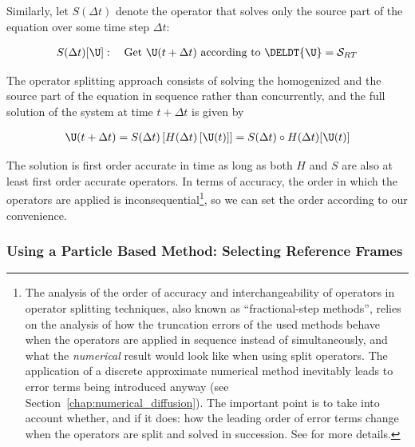Similarly, let $S(\Delta t)$ denote the operator that solves only the source part of the equation
over some time step $\Delta t$:

\begin{align}
  S(\Delta t) [\U]: \quad \text{Get }\U(t+\Delta t) \text{ according to } \DELDT{\U} =
\mathcal{S}_{RT}
\end{align}

The operator splitting approach consists of solving the homogenized and the source part of the
equation in sequence rather than concurrently, and the full solution of the system at time $t +
\Delta t$ is given by

\begin{align}
    \U(t+\Delta t) = S(\Delta t)\left[ H(\Delta t) \left[ \U(t) \right] \right] = S(\Delta t) \circ
H(\Delta t) [\U(t)] \label{eq:operator-splitting-hydro-rt}
\end{align}

The solution is first order accurate in time as long as both $H$ and $S$ are also at least first
order accurate operators. In terms of accuracy, the order in which the operators are applied is
inconsequential\footnote{
The analysis of the order of accuracy and interchangeability of operators in operator splitting
techniques, also known as ``fractional-step methods'', relies on the analysis of how the truncation
errors of the used methods behave when the operators are applied in sequence instead of
simultaneously, and what the \emph{numerical} result would look like when using split operators. The
application of a discrete approximate numerical method inevitably leads to error terms being
introduced anyway (see Section~\ref{chap:numerical_diffusion}). The important point is to take into
account whether, and if it does: how the leading order of error terms change when the operators are
split and solved in succession. See \citet{levequeFiniteVolumeMethods2002} for more details.
}, so we can set the order according to our convenience.









\subsubsection{Using a Particle Based Method: Selecting Reference Frames}


